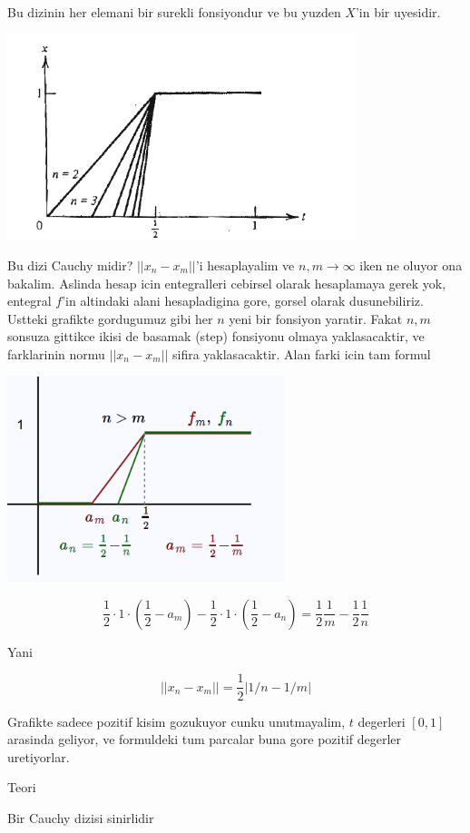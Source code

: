 \documentclass[12pt,fleqn]{article}\usepackage{../common}
\begin{document}
Bu dizinin her elemani bir surekli fonsiyondur ve bu yuzden $X$'in bir
uyesidir. 

\includegraphics[height=6cm]{5_1.png}

Bu dizi Cauchy midir? $||x_n - x_m||$'i hesaplayalim ve $n,m \to \infty$
iken ne oluyor ona bakalim. Aslinda hesap icin entegralleri cebirsel olarak
hesaplamaya gerek yok, entegral $f$'in altindaki alani hesapladigina gore,
gorsel olarak dusunebiliriz. Ustteki grafikte gordugumuz gibi her $n$ yeni
bir fonsiyon yaratir. Fakat $n,m$ sonsuza gittikce ikisi de basamak (step)
fonsiyonu olmaya yaklasacaktir, ve farklarinin normu $||x_n - x_m||$ sifira
yaklasacaktir. Alan farki icin tam formul

\includegraphics[height=6cm]{5_2.png}

\[ 
\frac{1}{2} \cdot 1 \cdot (\frac{ 1}{2}-a_m) - 
\frac{1}{2} \cdot 1 \cdot (\frac{ 1}{2}-a_n) =
\frac{ 1}{2}\frac{ 1}{m} - 
\frac{ 1}{2}\frac{ 1}{n} 
 \]

Yani

\[ ||x_n - x_m|| = \frac{ 1}{2}|1/n - 1/m| \]

Grafikte sadece pozitif kisim gozukuyor cunku unutmayalim, $t$ degerleri
$[0,1]$ arasinda geliyor, ve formuldeki tum parcalar buna gore pozitif
degerler uretiyorlar. 

Teori 

Bir Cauchy dizisi sinirlidir
\end{document}
